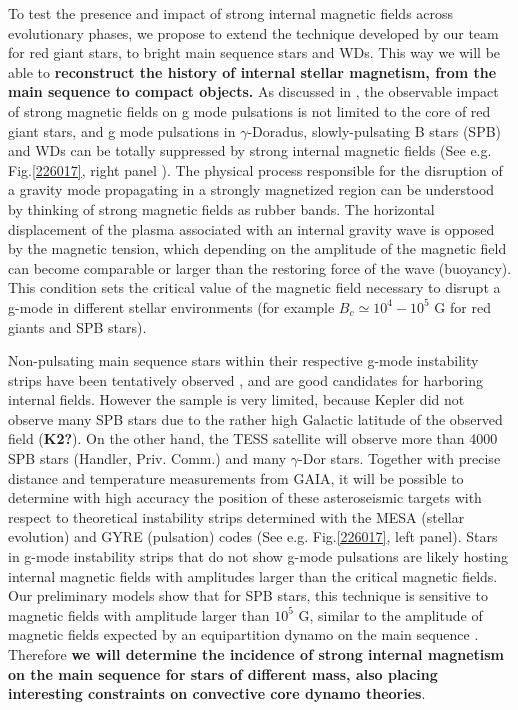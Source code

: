 To test the presence and impact of strong internal magnetic fields across evolutionary phases,
we propose to extend the technique developed by our team for red giant stars, to bright main sequence stars and WDs. This way we will be able to \textbf{reconstruct the history of internal stellar magnetism, from the main sequence to compact objects.} As discussed in \citet{Cantiello_2016}, the observable impact of strong magnetic fields on g mode pulsations is not limited to the core of red giant stars, and
 g mode pulsations in $\gamma$-Doradus, slowly-pulsating B stars (SPB) and WDs can be totally suppressed by strong internal magnetic fields (See e.g. Fig.\ref{226017}, right panel ). The physical process responsible for the disruption of a gravity mode propagating in a strongly magnetized region can be understood by thinking of strong magnetic fields as rubber bands. The horizontal displacement of the plasma associated with an internal gravity wave is opposed by the magnetic tension, which depending on the amplitude of the magnetic field can become comparable or larger than the restoring force of the wave (buoyancy). This condition sets the critical value of the magnetic field necessary to disrupt a g-mode in different stellar environments (for example $B_c \simeq 10^4-10^5$ G for red giants and SPB stars). 

Non-pulsating main sequence stars within their respective g-mode instability strips have been tentatively observed \citep{Balona_2011}, and are good candidates for harboring internal fields.
However the sample is very limited, because Kepler did not observe many SPB stars due to the rather high Galactic latitude of the observed field (\textbf{K2?}). On the other hand, the TESS satellite will observe more than 4000 SPB stars (Handler, Priv. Comm.) and many $\gamma$-Dor stars. Together with precise distance and temperature measurements from GAIA, it will be possible to determine with high accuracy the position of these asteroseismic targets with respect to theoretical instability strips determined with the MESA (stellar evolution) and GYRE (pulsation) codes (See e.g. Fig.\ref{226017}, left panel).
Stars in g-mode instability strips that do not show g-mode pulsations are likely hosting internal magnetic fields with amplitudes larger than the critical
magnetic fields. Our preliminary models show that for SPB stars, this technique is sensitive to magnetic fields with amplitude larger than $10^5$ G,
similar to the amplitude of magnetic fields expected by an equipartition dynamo on the main sequence \citep[See e.g.][]{Featherstone_2009,Augustson_2016}. Therefore \textbf{we will determine the incidence of strong internal magnetism on the main sequence for stars of different mass, also placing interesting constraints on convective core dynamo theories}.

